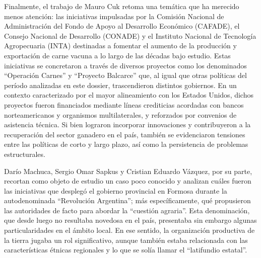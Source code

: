 \documentclass{article}
\begin{document}
Finalmente, el trabajo de Mauro Cuk retoma una temática que ha merecido menos atención: las iniciativas impulsadas por la Comisión Nacional de Administración del Fondo de Apoyo al Desarrollo Económico (CAFADE), el Consejo Nacional de Desarrollo (CONADE) y el Instituto Nacional de Tecnología Agropecuaria (INTA) destinadas a fomentar el aumento de la producción y exportación de carne vacuna a lo largo de las décadas bajo estudio. Estas iniciativas se concretaron a través de diversos proyectos como los denominados “Operación Carnes” y “Proyecto Balcarce” que, al igual que otras políticas del período analizadas en este dossier, trascendieron distintos gobiernos. En un contexto caracterizado por el mayor alineamiento con los Estados Unidos, dichos proyectos fueron financiados mediante líneas crediticias acordadas con bancos norteamericanos y organismos multilaterales, y reforzados por convenios de asistencia técnica. Si bien lograron incorporar innovaciones y contribuyeron a la recuperación del sector ganadero en el país, también se evidenciaron tensiones entre las políticas de corto y largo plazo, así como la persistencia de problemas estructurales.

Darío Machuca, Sergio Omar Sapkus y Cristian Eduardo Vázquez, por su parte, recortan como objeto de estudio un caso poco conocido y analizan cuáles fueron las iniciativas que desplegó el gobierno provincial en Formosa durante la autodenominada “Revolución Argentina”; más específicamente, qué propusieron las autoridades de facto para abordar la “cuestión agraria”. Esta denominación, que desde luego no resultaba novedosa en el país, presentaba sin embargo algunas particularidades en el ámbito local. En ese sentido, la organización productiva de la tierra jugaba un rol significativo, aunque también estaba relacionada con las características étnicas regionales y lo que se solía llamar el “latifundio estatal”.
\end{document}
